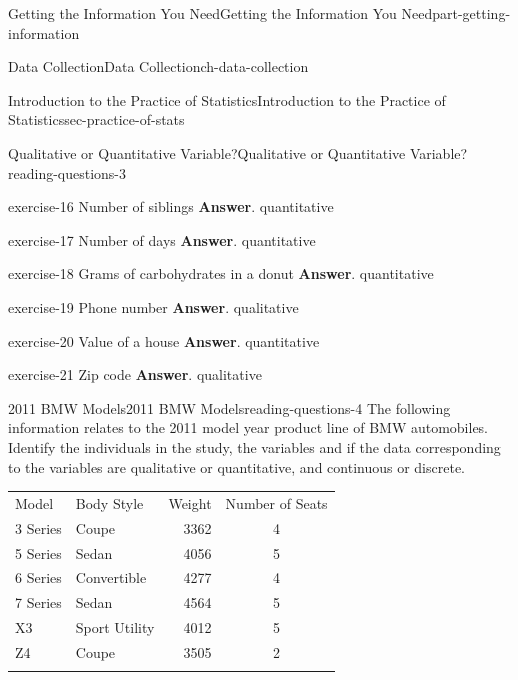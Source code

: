 \documentclass[oneside,10pt,]{book}
\numberwithin{equation}{section}
\newcommand{\hrulemedium}{\noalign{\hrule height 0.07em}}
\newcommand{\hrulethick} {\noalign{\hrule height 0.11em}}
\begin{document}
\begin{partptx}{Getting the Information You Need}{}{Getting the Information You Need}{}{}{part-getting-information}
\begin{chapterptx}{Data Collection}{}{Data Collection}{}{}{ch-data-collection}
\begin{sectionptx}{Introduction to the Practice of Statistics}{}{Introduction to the Practice of Statistics}{}{}{sec-practice-of-stats}
\begin{reading-questions-subsection-numberless}{Qualitative or Quantitative Variable?}{}{Qualitative or Quantitative Variable?}{}{}{reading-questions-3}
\begin{divisionexercise}{4}{}{}{exercise-16}
Number of siblings \textbf{Answer}.\hypertarget{answer-16}{}\quad%
quantitative\end{divisionexercise}%
\begin{divisionexercise}{5}{}{}{exercise-17}%
Number of days \textbf{Answer}.\hypertarget{answer-17}{}\quad%
quantitative\end{divisionexercise}%
\begin{divisionexercise}{6}{}{}{exercise-18}%
Grams of carbohydrates in a donut \textbf{Answer}.\hypertarget{answer-18}{}\quad%
quantitative\end{divisionexercise}%
\begin{divisionexercise}{7}{}{}{exercise-19}%
Phone number \textbf{Answer}.\hypertarget{answer-19}{}\quad%
qualitative\end{divisionexercise}%
\begin{divisionexercise}{8}{}{}{exercise-20}%
Value of a house \textbf{Answer}.\hypertarget{answer-20}{}\quad%
quantitative\end{divisionexercise}%
\begin{divisionexercise}{9}{}{}{exercise-21}%
Zip code \textbf{Answer}.\hypertarget{answer-21}{}\quad%
qualitative\end{divisionexercise}%
\end{reading-questions-subsection-numberless}
%
%
\typeout{************************************************}
\typeout{************************************************}
%
\begin{reading-questions-subsection-numberless}{2011 BMW Models}{}{2011 BMW Models}{}{}{reading-questions-4}
\hypertarget{p-4}{}%
The following information relates to the 2011 model year product line of BMW automobiles. Identify the individuals in the study, the variables and if the data corresponding to the variables are qualitative or quantitative, and continuous or discrete.%
\begin{table}
\centering
\begin{tabular}{llll}\hrulethick
Model&Body Style&Weight&Number of Seats\tabularnewline\hrulemedium
3 Series&Coupe&\multicolumn{1}{r}{3362}&\multicolumn{1}{c}{4}\tabularnewline[0pt]
5 Series&Sedan&\multicolumn{1}{r}{4056}&\multicolumn{1}{c}{5}\tabularnewline[0pt]
6 Series&Convertible&\multicolumn{1}{r}{4277}&\multicolumn{1}{c}{4}\tabularnewline[0pt]
7 Series&Sedan&\multicolumn{1}{r}{4564}&\multicolumn{1}{c}{5}\tabularnewline[0pt]
X3&Sport Utility&\multicolumn{1}{r}{4012}&\multicolumn{1}{c}{5}\tabularnewline[0pt]
Z4&Coupe&\multicolumn{1}{r}{3505}&\multicolumn{1}{c}{2}\tabularnewline\hrulethick

\end{tabular}
\end{table}
\end{reading-questions-subsection-numberless}
\end{sectionptx}
\end{chapterptx}
\end{partptx}
\end{document}
